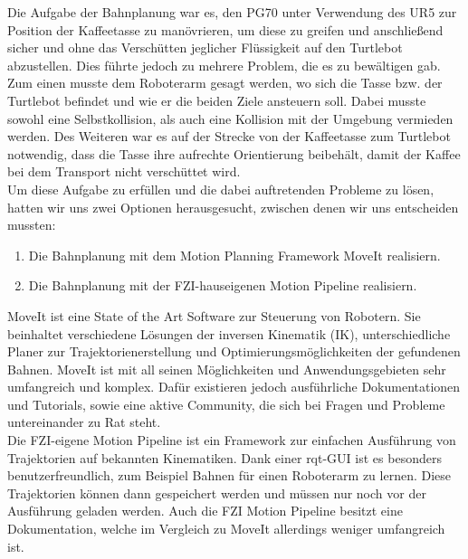 Die Aufgabe der Bahnplanung war es, den PG70 unter Verwendung des UR5 zur Position der Kaffeetasse zu manövrieren, um diese zu greifen und anschließend sicher und ohne das Verschütten jeglicher Flüssigkeit auf den Turtlebot abzustellen. Dies führte jedoch zu mehrere Problem, die es zu bewältigen gab.
\newline
Zum einen musste dem Roboterarm gesagt werden, wo sich die Tasse bzw. der Turtlebot befindet und wie er die beiden Ziele ansteuern soll. Dabei musste sowohl eine Selbstkollision, als auch eine Kollision mit der Umgebung vermieden werden. Des Weiteren war es auf der Strecke von der Kaffeetasse zum Turtlebot notwendig, dass die Tasse ihre aufrechte Orientierung beibehält, damit der Kaffee bei dem Transport nicht verschüttet wird.
\newline \\
Um diese Aufgabe zu erfüllen und die dabei auftretenden Probleme zu lösen, hatten wir uns zwei Optionen herausgesucht, zwischen denen wir uns entscheiden mussten:
\begin{enumerate}
	\item Die Bahnplanung mit dem Motion Planning Framework MoveIt \cite{MoveIt} realisiern.
	\item Die Bahnplanung mit der FZI-hauseigenen Motion Pipeline \cite{FZIPipeline} realisiern.
\end{enumerate}
MoveIt ist eine State of the Art Software zur Steuerung von Robotern. Sie beinhaltet verschiedene Lösungen der inversen Kinematik (IK), unterschiedliche Planer zur Trajektorienerstellung und Optimierungsmöglichkeiten der gefundenen Bahnen. MoveIt ist mit all seinen Möglichkeiten und Anwendungsgebieten sehr umfangreich und komplex. Dafür existieren jedoch ausführliche Dokumentationen und Tutorials, sowie eine aktive Community, die sich bei Fragen und Probleme untereinander zu Rat steht.
\newline  \\
Die FZI-eigene Motion Pipeline ist ein Framework zur einfachen Ausführung von Trajektorien auf bekannten Kinematiken. Dank einer rqt-GUI ist es besonders benutzerfreundlich, zum Beispiel Bahnen für einen Roboterarm zu lernen. Diese Trajektorien können dann gespeichert werden und müssen nur noch vor der Ausführung geladen werden. Auch die FZI Motion Pipeline besitzt eine Dokumentation, welche im Vergleich zu MoveIt allerdings weniger umfangreich ist.
